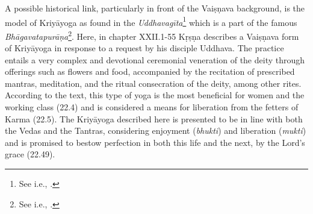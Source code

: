 A possible historical link, particularly in front of the Vaiṣṇava background, is the model of Kriyāyoga as found in the \textit{Uddhavagīta}\footnote{See i.e., \citeauthor[2007]{uddhavagita2007}.} which is a part of the famous \textit{Bhāgavatapurāṇa}\footnote{See i.e., \citeauthor[1950]{bhagavata}.}. Here, in chapter XXII.1-55 Kṛṣṇa describes a Vaiṣṇava form of Kriyāyoga in response to a request by his disciple Uddhava. The practice entails a very complex and devotional ceremonial veneration of the deity through offerings such as flowers and food, accompanied by the recitation of prescribed mantras, meditation, and the ritual consecration of the deity, among other rites. According to the text, this type of yoga is the most beneficial for women and the working class (22.4) and is considered a means for liberation from the fetters of Karma (22.5). The Kriyāyoga described here is presented to be in line with both the Vedas and the Tantras, considering enjoyment (\textit{bhukti}) and liberation (\textit{mukti}) and is promised to bestow perfection in both this life and the next, by the Lord's grace (22.49).  

